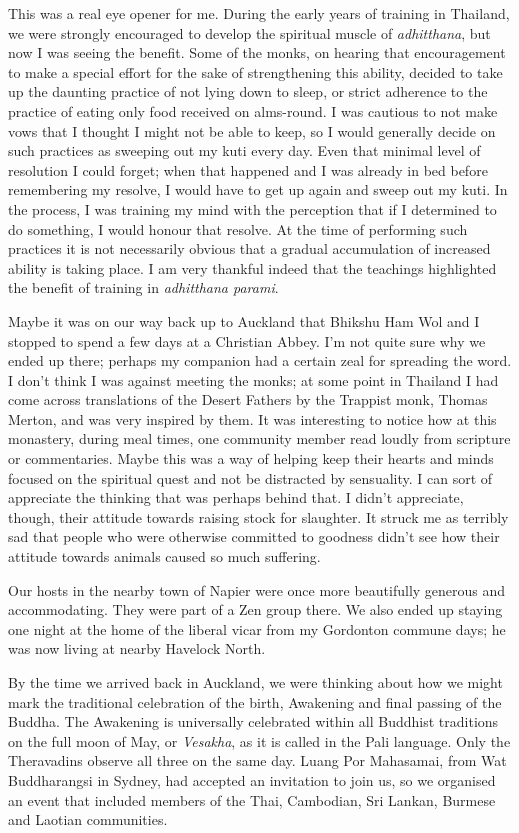 This was a real eye opener for me. During the early years of training in
Thailand, we were strongly encouraged to develop the spiritual muscle of
\emph{adhitthana}, but now I was seeing the benefit. Some of the monks,
on hearing that encouragement to make a special effort for the sake of
strengthening this ability, decided to take up the daunting practice of
not lying down to sleep, or strict adherence to the practice of eating
only food received on alms-round. I was cautious to not make vows that I
thought I might not be able to keep, so I would generally decide on such
practices as sweeping out my kuti every day. Even that minimal level of
resolution I could forget; when that happened and I was already in bed
before remembering my resolve, I would have to get up again and sweep
out my kuti. In the process, I was training my mind with the perception
that if I determined to do something, I would honour that resolve. At
the time of performing such practices it is not necessarily obvious that
a gradual accumulation of increased ability is taking place. I am very
thankful indeed that the teachings highlighted the benefit of training
in \emph{adhitthana parami}.

Maybe it was on our way back up to Auckland that Bhikshu Ham Wol and I
stopped to spend a few days at a Christian Abbey. I'm not quite sure why
we ended up there; perhaps my companion had a certain zeal for spreading
the word. I don't think I was against meeting the monks; at some point
in Thailand I had come across translations of the Desert Fathers\cite{desert}
by the Trappist monk, Thomas Merton, and was very
inspired by them. It was interesting to notice how at this monastery,
during meal times, one community member read loudly from scripture or
commentaries. Maybe this was a way of helping keep their hearts and
minds focused on the spiritual quest and not be distracted by
sensuality. I can sort of appreciate the thinking that was perhaps
behind that. I didn't appreciate, though, their attitude towards raising
stock for slaughter. It struck me as terribly sad that people who were
otherwise committed to goodness didn't see how their attitude towards
animals caused so much suffering.

Our hosts in the nearby town of Napier were once more beautifully
generous and accommodating. They were part of a Zen group there. We also
ended up staying one night at the home of the liberal vicar from my
Gordonton commune days; he was now living at nearby Havelock North.

By the time we arrived back in Auckland, we were thinking about how we
might mark the traditional celebration of the birth, Awakening and final
passing of the Buddha. The Awakening is universally celebrated within
all Buddhist traditions on the full moon of May, or \emph{Vesakha}, as
it is called in the Pali language. Only the Theravadins observe all
three on the same day. Luang Por Mahasamai, from Wat Buddharangsi in
Sydney, had accepted an invitation to join us, so we organised an event
that included members of the Thai, Cambodian, Sri Lankan, Burmese and
Laotian communities.

